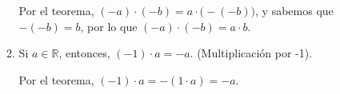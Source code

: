 \documentclass[11pt]{article}
\newcommand{\R}{\mathbb{R}}
\begin{document}
\begin{enumerate}[label=\alph*)]
\begin{enumerate}[label=\roman*)]
        Por el teorema, $(-a)\cdot (-b) = a\cdot \bigl(-(-b)\bigr)$, y sabemos que $-(-b)=b$, por lo que $(-a)\cdot (-b) =a\cdot b$.

        \item Si $a\in \R$, entonces, $(-1) \cdot a =-a $. (Multiplicación por -1).

        Por el teorema, $(-1)\cdot a = -(1\cdot a) = -a$.
        

\end{enumerate}
\end{enumerate}
\end{document}
